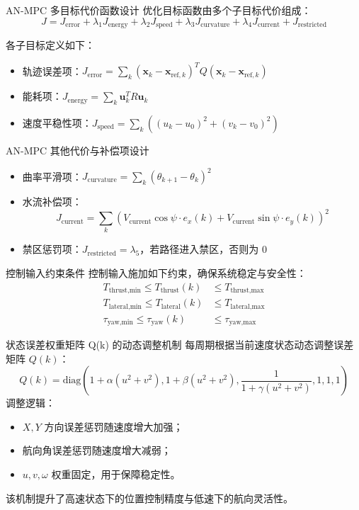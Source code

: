 \begin{frame}{AN-MPC 多目标代价函数设计}
\justifying
优化目标函数由多个子目标代价组成：
\[
J = J_{\text{error}} + \lambda_1 J_{\text{energy}} + \lambda_2 J_{\text{speed}} + \lambda_3 J_{\text{curvature}} + \lambda_4 J_{\text{current}} + J_{\text{restricted}}
\]

各子目标定义如下：
\begin{itemize}
    \item 轨迹误差项：$J_{\text{error}} = \sum_k (\boldsymbol{x}_k - \boldsymbol{x}_{\text{ref},k})^T Q (\boldsymbol{x}_k - \boldsymbol{x}_{\text{ref},k})$
    \item 能耗项：$J_{\text{energy}} = \sum_k \boldsymbol{u}_k^T R \boldsymbol{u}_k$
    \item 速度平稳性项：$J_{\text{speed}} = \sum_k \left( (u_k - u_0)^2 + (v_k - v_0)^2 \right)$
\end{itemize}
\end{frame}

\begin{frame}{AN-MPC 其他代价与补偿项设计}
\justifying
\begin{itemize}
    \item 曲率平滑项：$J_{\text{curvature}} = \sum_k (\theta_{k+1} - \theta_k)^2$
    \item 水流补偿项：
    \[
    J_{\text{current}} = \sum_k (V_{\text{current}} \cos \psi \cdot e_x(k) + V_{\text{current}} \sin \psi \cdot e_y(k))^2
    \]
    \item 禁区惩罚项：$J_{\text{restricted}} = \lambda_5$，若路径进入禁区，否则为 0
\end{itemize}
\end{frame}

\begin{frame}{控制输入约束条件}
\justifying
控制输入施加如下约束，确保系统稳定与安全性：
\[
\begin{aligned}
T_{\text{thrust,min}} \leq T_{\text{thrust}}(k) &\leq T_{\text{thrust,max}} \\
T_{\text{lateral,min}} \leq T_{\text{lateral}}(k) &\leq T_{\text{lateral,max}} \\
\tau_{\text{yaw,min}} \leq \tau_{\text{yaw}}(k) &\leq \tau_{\text{yaw,max}}
\end{aligned}
\]
\end{frame}

\begin{frame}{状态误差权重矩阵 Q(k) 的动态调整机制}
\justifying
每周期根据当前速度状态动态调整误差矩阵 $Q(k)$：
\[
Q(k) = \text{diag} \left(1 + \alpha(u^2 + v^2), 1 + \beta(u^2 + v^2), \frac{1}{1 + \gamma(u^2 + v^2)}, 1, 1, 1 \right)
\]
调整逻辑：
\begin{itemize}
    \item $X,Y$ 方向误差惩罚随速度增大加强；
    \item 航向角误差惩罚随速度增大减弱；
    \item $u,v,\omega$ 权重固定，用于保障稳定性。
\end{itemize}
该机制提升了高速状态下的位置控制精度与低速下的航向灵活性。
\end{frame}
